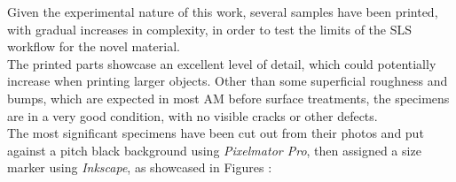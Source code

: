 \documentclass[a4paper]{article}
\begin{document}
        Given the experimental nature of this work, several samples have been printed, with gradual 
        increases in complexity, in order to test the limits of the SLS workflow for the novel material. \\ 

        
        The printed parts showcase an excellent level of detail, which could potentially increase when printing larger objects. 
        Other than some superficial roughness and bumps, which are expected
        in most AM before surface treatments, the specimens are in a very good condition, with no visible cracks or other defects. \\ 

        The most significant specimens have been cut out from their photos and put against a pitch black background
        using \textit{Pixelmator Pro}, then assigned a size marker using \textit{Inkscape}, 
        as showcased in Figures : 

\end{document}
